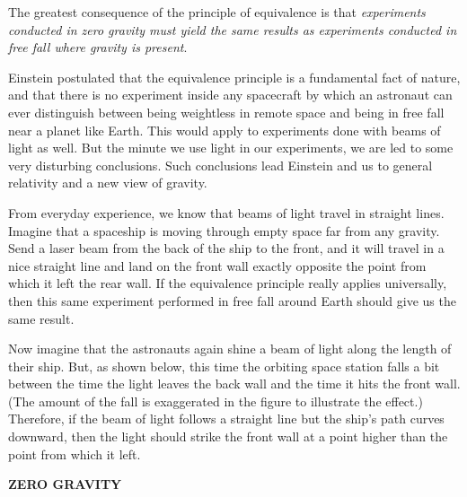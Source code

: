 \documentclass{article}
\numberwithin{equation}{section}
\numberwithin{figure}{section}
\begin{document}
The greatest consequence of the principle of equivalence is that \textit{experiments conducted in zero gravity must yield the same results as experiments conducted in free fall where gravity is present}.
\vspace{1em}

Einstein postulated that the equivalence principle is a fundamental fact of nature, and that there is no experiment inside any spacecraft by which an astronaut can ever distinguish between being weightless in remote space and being in free fall near a planet like Earth. This would apply to experiments done with beams of light as well. But the minute we use light in our experiments, we are led to some very disturbing conclusions. Such conclusions lead Einstein and us to general relativity and a new view of gravity.
\vspace{1em}

From everyday experience, we know that beams of light travel in straight lines. Imagine that a spaceship is moving through empty space far from any gravity. Send a laser beam from the back of the ship to the front, and it will travel in a nice straight line and land on the front wall exactly opposite the point from which it left the rear wall. If the equivalence principle really applies universally, then this same experiment performed in free fall around Earth should give us the same result.
\vspace{1em}

Now imagine that the astronauts again shine a beam of light along the length of their ship. But, as shown below, this time the orbiting space station falls a bit between the time the light leaves the back wall and the time it hits the front wall. (The amount of the fall is exaggerated in the figure to illustrate the effect.) Therefore, if the beam of light follows a straight line but the ship's path curves downward, then the light should strike the front wall at a point higher than the point from which it left.


\begin{center}
\textbf{ZERO GRAVITY}
\vspace{1ex}

\end{center}
\vspace{1em}
\end{document}
